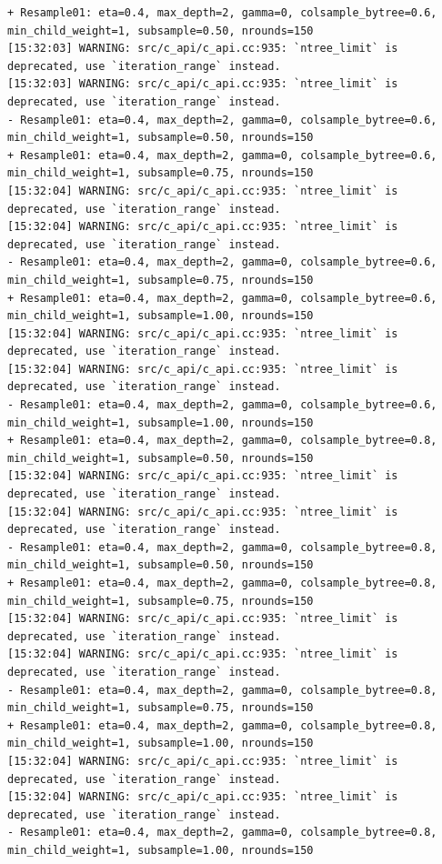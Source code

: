 \documentclass[
  letterpaper,
  DIV=11,
  numbers=noendperiod]{scrartcl}
\begin{document}
\begin{verbatim}
+ Resample01: eta=0.4, max_depth=2, gamma=0, colsample_bytree=0.6, min_child_weight=1, subsample=0.50, nrounds=150 
[15:32:03] WARNING: src/c_api/c_api.cc:935: `ntree_limit` is deprecated, use `iteration_range` instead.
[15:32:03] WARNING: src/c_api/c_api.cc:935: `ntree_limit` is deprecated, use `iteration_range` instead.
- Resample01: eta=0.4, max_depth=2, gamma=0, colsample_bytree=0.6, min_child_weight=1, subsample=0.50, nrounds=150 
+ Resample01: eta=0.4, max_depth=2, gamma=0, colsample_bytree=0.6, min_child_weight=1, subsample=0.75, nrounds=150 
[15:32:04] WARNING: src/c_api/c_api.cc:935: `ntree_limit` is deprecated, use `iteration_range` instead.
[15:32:04] WARNING: src/c_api/c_api.cc:935: `ntree_limit` is deprecated, use `iteration_range` instead.
- Resample01: eta=0.4, max_depth=2, gamma=0, colsample_bytree=0.6, min_child_weight=1, subsample=0.75, nrounds=150 
+ Resample01: eta=0.4, max_depth=2, gamma=0, colsample_bytree=0.6, min_child_weight=1, subsample=1.00, nrounds=150 
[15:32:04] WARNING: src/c_api/c_api.cc:935: `ntree_limit` is deprecated, use `iteration_range` instead.
[15:32:04] WARNING: src/c_api/c_api.cc:935: `ntree_limit` is deprecated, use `iteration_range` instead.
- Resample01: eta=0.4, max_depth=2, gamma=0, colsample_bytree=0.6, min_child_weight=1, subsample=1.00, nrounds=150 
+ Resample01: eta=0.4, max_depth=2, gamma=0, colsample_bytree=0.8, min_child_weight=1, subsample=0.50, nrounds=150 
[15:32:04] WARNING: src/c_api/c_api.cc:935: `ntree_limit` is deprecated, use `iteration_range` instead.
[15:32:04] WARNING: src/c_api/c_api.cc:935: `ntree_limit` is deprecated, use `iteration_range` instead.
- Resample01: eta=0.4, max_depth=2, gamma=0, colsample_bytree=0.8, min_child_weight=1, subsample=0.50, nrounds=150 
+ Resample01: eta=0.4, max_depth=2, gamma=0, colsample_bytree=0.8, min_child_weight=1, subsample=0.75, nrounds=150 
[15:32:04] WARNING: src/c_api/c_api.cc:935: `ntree_limit` is deprecated, use `iteration_range` instead.
[15:32:04] WARNING: src/c_api/c_api.cc:935: `ntree_limit` is deprecated, use `iteration_range` instead.
- Resample01: eta=0.4, max_depth=2, gamma=0, colsample_bytree=0.8, min_child_weight=1, subsample=0.75, nrounds=150 
+ Resample01: eta=0.4, max_depth=2, gamma=0, colsample_bytree=0.8, min_child_weight=1, subsample=1.00, nrounds=150 
[15:32:04] WARNING: src/c_api/c_api.cc:935: `ntree_limit` is deprecated, use `iteration_range` instead.
[15:32:04] WARNING: src/c_api/c_api.cc:935: `ntree_limit` is deprecated, use `iteration_range` instead.
- Resample01: eta=0.4, max_depth=2, gamma=0, colsample_bytree=0.8, min_child_weight=1, subsample=1.00, nrounds=150 

\end{verbatim}
\end{document}
